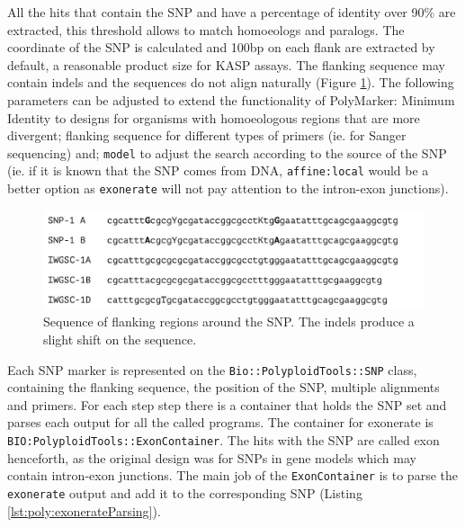 All the hits that contain the SNP and have a percentage of identity over 90\% are extracted, this threshold allows to match homoeologs and paralogs. 
The coordinate of the SNP is calculated and 100bp on each flank are extracted by default, a reasonable product size for KASP assays. 
The flanking sequence may contain \acrshort{indels} and the sequences do not align naturally (Figure \ref{fig:poly:globalSequence}).
The following parameters can be adjusted to extend the functionality of PolyMarker: Minimum Identity to designs for organisms with homoeologous regions that are more divergent; flanking sequence for different types of primers (ie. for Sanger sequencing) and;  \verb|model| to adjust the search according to the source of the SNP (ie. if it is known that the SNP comes from DNA, \verb|affine:local| would be a better option as \verb|exonerate| will not pay attention to the intron-exon junctions).

\begin{figure}
\centering
\includegraphics[width=1\textwidth]{PolyMarker/Figures/aln/scaffoldsFound.pdf}
\caption[Sequence of flanking regions around the SNP.]{Sequence of flanking regions around the SNP. The \acrshort{indels} produce a slight shift on the sequence.}
\label{fig:poly:globalSequence}
\end{figure}


Each SNP marker is represented on the \verb|Bio::PolyploidTools::SNP| class, containing the flanking sequence, the position of the SNP, multiple alignments and primers. 
For each step step there is a container that holds the SNP set and parses each output for all the called programs. 
The container for exonerate is \verb|BIO:PolyploidTools::ExonContainer|. 
The hits with the SNP are called exon henceforth, as the original design was for SNPs in gene models which may contain intron-exon junctions. 
The main job of the \verb|ExonContainer| is to parse the \verb|exonerate| output and add it to the corresponding SNP (Listing \ref{lst:poly:exonerateParsing}). 

